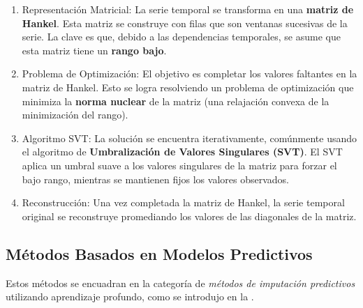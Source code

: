 \begin{enumerate}
    \item Representación Matricial: La serie temporal se transforma en una \textbf{matriz de Hankel}. Esta matriz se construye con filas que son ventanas sucesivas de la serie. La clave es que, debido a las dependencias temporales, se asume que esta matriz tiene un \textbf{rango bajo}.
    
    \item Problema de Optimización: El objetivo es completar los valores faltantes en la matriz de Hankel. Esto se logra resolviendo un problema de optimización que minimiza la \textbf{norma nuclear} de la matriz (una relajación convexa de la minimización del rango).

    \item Algoritmo SVT: La solución se encuentra iterativamente, comúnmente usando el algoritmo de \textbf{Umbralización de Valores Singulares (SVT)}. El SVT aplica un umbral suave a los valores singulares de la matriz para forzar el bajo rango, mientras se mantienen fijos los valores observados.

     \item Reconstrucción: Una vez completada la matriz de Hankel, la serie temporal original se reconstruye promediando los valores de las diagonales de la matriz.
\end{enumerate}


\subsection{Métodos Basados en Modelos Predictivos}
\label{subsec:metodos_predictivos_dl}
Estos métodos se encuadran en la categoría de \textit{métodos de imputación predictivos} utilizando aprendizaje profundo, como se introdujo en la .

